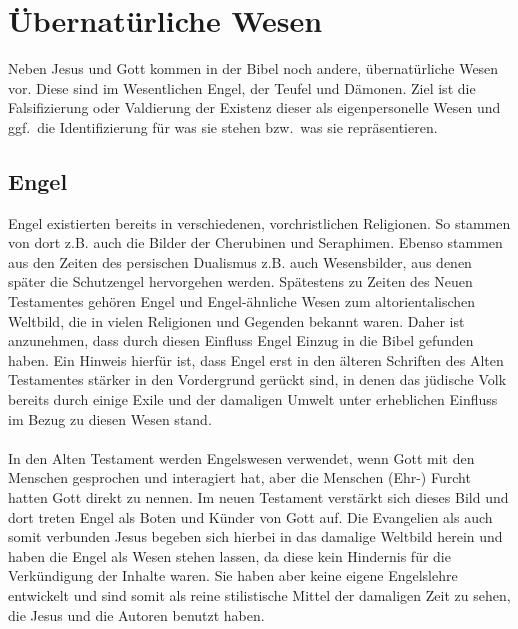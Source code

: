 \chapter{Übernatürliche Wesen}
Neben Jesus und Gott kommen in der Bibel noch andere, übernatürliche Wesen vor. Diese sind im Wesentlichen Engel, der Teufel und Dämonen. Ziel ist die Falsifizierung oder Valdierung der Existenz dieser als eigenpersonelle Wesen und ggf.\ die Identifizierung für was sie stehen bzw.\ was sie repräsentieren.

\section{Engel}
Engel existierten bereits in verschiedenen, vorchristlichen Religionen. So stammen von dort z.B. auch die Bilder der Cherubinen und Seraphimen. Ebenso
stammen aus den Zeiten des persischen Dualismus z.B. auch Wesensbilder, aus denen später die Schutzengel hervorgehen werden. Spätestens zu Zeiten des Neuen Testamentes gehören Engel und Engel-ähnliche Wesen zum altorientalischen Weltbild, die in vielen Religionen und Gegenden bekannt waren. Daher ist anzunehmen, dass durch diesen Einfluss Engel Einzug in die Bibel gefunden haben. Ein Hinweis hierfür ist, dass Engel erst in den älteren Schriften des Alten Testamentes stärker in den Vordergrund gerückt sind, in denen das jüdische Volk bereits durch einige Exile und der damaligen Umwelt
unter erheblichen Einfluss im Bezug zu diesen Wesen stand.
\\~\\
In den Alten Testament werden Engelswesen verwendet, wenn Gott mit den Menschen gesprochen und interagiert hat, aber die Menschen (Ehr-) Furcht hatten
Gott direkt zu nennen. Im neuen Testament verstärkt sich dieses Bild und dort treten Engel als Boten und Künder von Gott auf.  Die Evangelien als auch somit
verbunden Jesus begeben sich hierbei in das damalige Weltbild herein und haben die Engel als Wesen stehen lassen, da diese kein Hindernis für die Verkündigung
der Inhalte waren. Sie haben aber keine eigene Engelslehre entwickelt und sind somit als reine stilistische Mittel der damaligen Zeit zu sehen, die Jesus und die Autoren benutzt haben. \\

